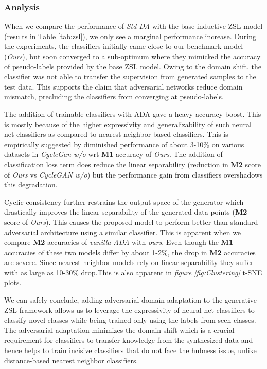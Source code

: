 \documentclass[10pt,twocolumn,letterpaper]{article}
\begin{document}
\subsubsection{Analysis}
When we compare the performance of \textit{Std DA} with the base inductive ZSL model (results in Table \ref{tab:zsl}), we only see a marginal performance increase. During the experiments, the classifiers initially came close to our benchmark model (\textit{Ours}), but soon converged to a sub-optimum where they mimicked the accuracy of pseudo-labels provided by the base ZSL model. Owing to the domain shift, the classifier was not able to transfer the supervision from generated samples to the test data. This supports the claim that adversarial networks reduce domain mismatch, precluding the classifiers from converging at pseudo-labels. 

The addition of trainable classifiers with ADA gave a heavy accuracy boost. This is mostly because of the higher expressivity and generalizability of such neural net classifiers as compared to nearest neighbor based classifiers. This is empirically suggested by diminished performance of about 3-10\% on various datasets in \textit{CycleGan w/o} wrt \textbf{M1} accuracy of \textit{Ours}. The addition of classification loss term does reduce the linear separability (reduction in \textbf{M2} score of \textit{Ours} vs \textit{CycleGAN w/o}) but the performance gain from classifiers overshadows this degradation.

Cyclic consistency further restrains the output space of the generator which drastically improves the linear separability of the generated data points (\textbf{M2} score of \textit{Ours}). This causes the proposed model to perform better than standard adversarial architecture using a similar classifier. This is apparent when we compare \textbf{M2} accuracies of \textit{vanilla ADA} with \textit{ours}. Even though the \textbf{M1} accuracies of these two models differ by about 1-2\%, the drop in \textbf{M2} accuracies are severe. Since nearest neighbor models rely on linear separability they suffer with as large as 10-30\% drop.This is also apparent in \textit{figure \ref{fig:Clustering}} t-SNE plots.

We can safely conclude, adding adversarial domain adaptation to the generative ZSL framework allows us to leverage the expressivity of neural net classifiers to classify novel classes while being trained only using the labels from seen classes. The adversarial adaptation minimizes the domain shift which is a crucial requirement for classifiers to transfer knowledge from the synthesized data and hence helps to train incisive classifiers that do not face the hubness issue, unlike distance-based nearest neighbor classifiers.
\end{document}
